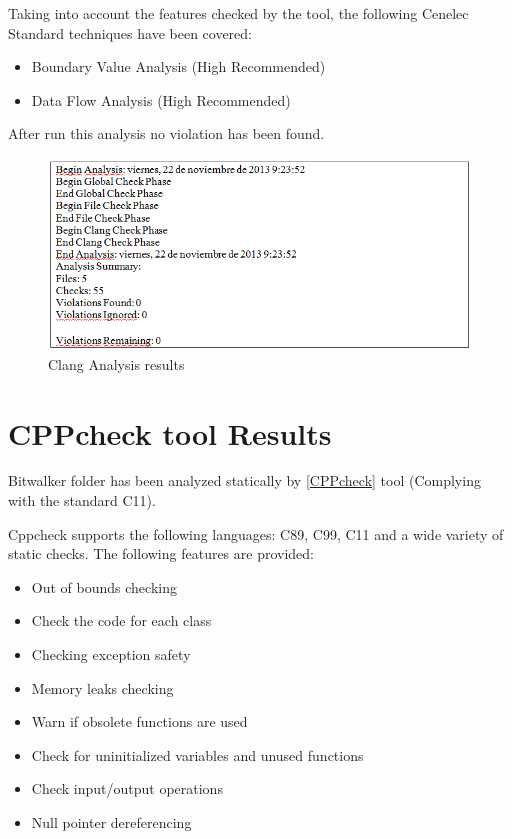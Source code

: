 Taking into account the features checked by the tool, the following Cenelec Standard techniques have been covered:
\begin{itemize}
\item Boundary Value Analysis (High Recommended)
\item Data Flow Analysis (High Recommended)
\end{itemize}

After run this analysis no violation has been found.

\begin{figure}[H]
\centering
\includegraphics[scale=0.8]{./figures/clang.png}
\caption{Clang Analysis results}
\end{figure}

\section{CPPcheck tool Results}

Bitwalker folder has been analyzed statically by \href{http://cppcheck.sourceforge.net/}{[CPPcheck]} tool (Complying with the standard C11).

Cppcheck supports the following languages: C89, C99, C11 and a wide variety of static checks. The following features are provided:
\begin{itemize}
\item Out of bounds checking
\item Check the code for each class
\item Checking exception safety
\item Memory leaks checking
\item Warn if obsolete functions are used
\item Check for uninitialized variables and unused functions
\item Check input/output operations
\item Null pointer dereferencing
\end{itemize}

